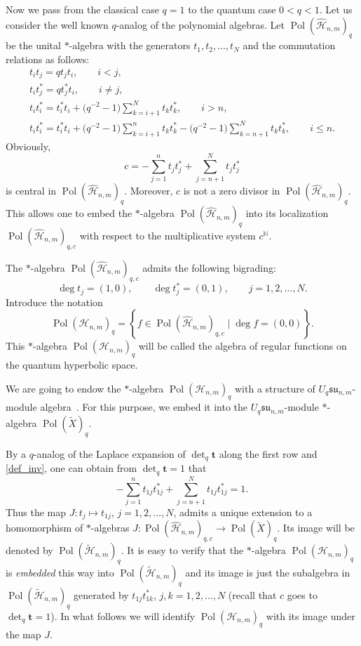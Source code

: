 Now we pass from the classical case $q=1$ to the quantum case $0<q<1$. Let us consider the well known
\cite{RTF} $q$-analog of the polynomial algebras. Let $\operatorname{Pol}(\widehat{\mathscr{H}}_{n,m})_q$
be the unital $*$-algebra with the generators $t_1,t_{2},\ldots,t_N$ and the commutation relations as
follows:
\begin{gather*}
t_it_j = qt_jt_i,\qquad i<j,
\\ t_it_j^* = qt_j^*t_i,\qquad i\ne j,
\\ t_it_i^* = t_i^*t_i+\big(q^{-2}-1\big)\sum_{k=i+1}^Nt_kt_k^*,\qquad i>n,
\\ t_it_i^* = t_i^*t_i+\big(q^{-2}-1\big)\sum_{k=i+1}^nt_kt_k^*-
\big(q^{-2}-1\big)\sum_{k=n+1}^Nt_kt_k^*,\qquad i\le n.
\end{gather*}
Obviously, \[c=-\sum_{j=1}^nt_jt_j^*+\sum_{j=n+1}^Nt_jt_j^*\] is central in
$\operatorname{Pol}(\widehat{\mathscr{H}}_{n,m})_q$. Moreover, $c$ is not a zero divisor in
$\operatorname{Pol}(\widehat{\mathscr{H}}_{n,m})_q$. This allows one to embed the $*$-algebra
$\operatorname{Pol}(\widehat{\mathscr{H}}_{n,m})_q$ into its localization
$\operatorname{Pol}(\widehat{\mathscr{H}}_{n,m})_{q,c}$ with respect to the multiplicative system
$c^{\mathbb{N}}$.

The $*$-algebra $\operatorname{Pol}(\widehat{\mathscr{H}}_{n,m})_{q,c}$ admits the following bigrading:
\[\deg t_{j}=(1,0),\qquad\deg t_j^*=(0,1),\qquad j=1,2,\ldots,N.\] Introduce the notation
\[
\operatorname{Pol}(\mathscr{H}_{n,m})_q=\left\{ f\in
\operatorname{Pol}(\widehat{\mathscr{H}}_{n,m})_{q,c} \; \big|\; \deg f=(0,0)\right\}.
\]
This $*$-algebra $\operatorname{Pol}(\mathscr{H}_{n,m})_q$ will be called the algebra of regular functions on
the quantum hyperbolic space.



We are going to endow the $*$-algebra $\operatorname{Pol}(\mathscr{H}_{n,m})_q$ with a structure of
$U_{q}\mathfrak{su}_{n,m}$-module algebra~\cite{Ch-P}. For this purpose, we embed it into the
$U_{q}\mathfrak{su}_{n,m}$-module $*$-algebra $\operatorname{Pol}(\widetilde{X})_q$.

By a $q$-analog of the Laplace expansion of $\det_q \mathbf{t}$ along the f\/irst row \cite[Section~9.2]{Kl-Sch} and
\eqref{def_inv}, one can obtain from $\det_q \mathbf{t}=1$ that
\[
-\sum_{j=1}^nt_{1j}t_{1j}^*+\sum_{j=n+1}^Nt_{1j}t_{1j}^*=1.
\]
Thus the map $J:t_j\mapsto t_{1j}$, $j=1,2,\ldots,N$, admits a unique extension to a homomorphism of
$*$-algebras $J:\operatorname{Pol}(\widehat{\mathscr{H}}_{n,m})_{q,c}\to
\operatorname{Pol}(\widetilde{X})_q$. Its image will be denoted by
$\operatorname{Pol}(\widetilde{\mathscr{H}}_{n,m})_q$. It is easy to verify that the $*$-algebra
$\operatorname{Pol}(\mathscr{H}_{n,m})_q$ is {\it embedded} this way into
$\operatorname{Pol}(\widetilde{\mathscr{H}}_{n,m})_q$ and its image is just the subalgebra in
$\operatorname{Pol}(\widetilde{\mathscr{H}}_{n,m})_q$ generated by $t_{1j}t_{1k}^*$, $j,k=1,2,\ldots,N$
(recall that $c$ goes to $\det_q \mathbf{t}=1$). In what follows we will identify
$\operatorname{Pol}(\mathscr{H}_{n,m})_q$ with its image under the map $J$.

